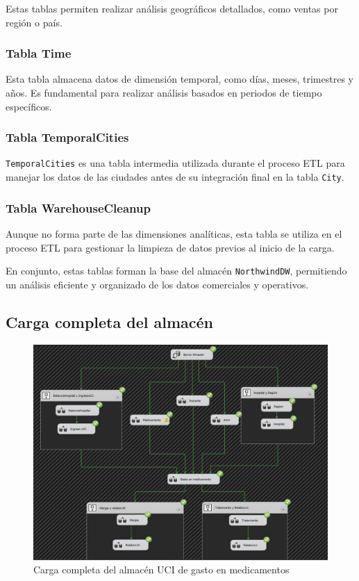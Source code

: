 \documentclass{article}
\begin{document}
	Estas tablas permiten realizar análisis geográficos detallados, como ventas por región o país.
	
	\subsubsection{Tabla Time}
	Esta tabla almacena datos de dimensión temporal, como días, meses, trimestres y años. Es fundamental para realizar análisis basados en periodos de tiempo específicos.
	
	\subsubsection{Tabla TemporalCities}
	\texttt{TemporalCities} es una tabla intermedia utilizada durante el proceso ETL para manejar los datos de las ciudades antes de su integración final en la tabla \texttt{City}.
	
	\subsubsection{Tabla WarehouseCleanup}
	Aunque no forma parte de las dimensiones analíticas, esta tabla se utiliza en el proceso ETL para gestionar la limpieza de datos previos al inicio de la carga.
	
	En conjunto, estas tablas forman la base del almacén \texttt{NorthwindDW}, permitiendo un análisis eficiente y organizado de los datos comerciales y operativos.
	
	\subsection{Carga completa del almacén}
	
	\begin{figure}[H]
		\centering
		\includegraphics[width=\linewidth]{./images/completados/flujo_completo_uci.jpeg}
		\caption{Carga completa del almacén UCI de gasto en medicamentos}
	\end{figure}
\end{document}
